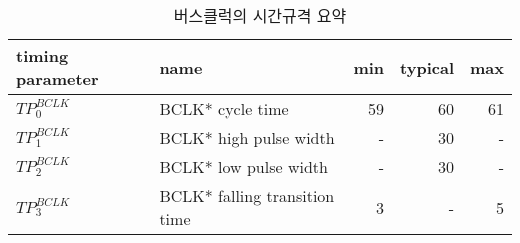 %
%
\begin{table}[htbp]
\caption{버스클럭의 시간규격 요약}\label{table:bclk-time}
   \begin{center}
   \begin{tabular}{|l|l|r|r|r|} \hline
	timing parameter & name & min & typical & max \\ \hline \hline
	$TP^{BCLK}_0$ & BCLK* cycle time & 59 & 60 & 61 \\ \hline
	$TP^{BCLK}_1$ & BCLK* high pulse width & - & 30 & - \\ \hline
	$TP^{BCLK}_2$ & BCLK* low pulse width & - & 30 & - \\ \hline
	$TP^{BCLK}_3$ & BCLK* falling transition time & 3 & - & 5 \\ \hline
   \end{tabular}
   \end{center}
\end{table}
%
%
